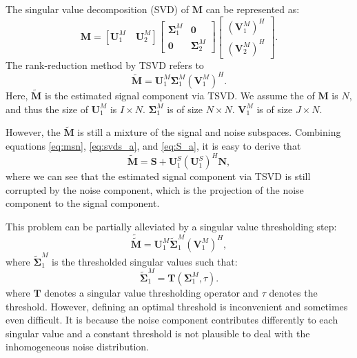 The singular value decomposition (SVD) of $\mathbf{M}$ can be represented as:
\begin{equation}
\label{eq:svdm_a}
\mathbf{M} = [\mathbf{U}_1^{M}\quad \mathbf{U}_2^{M}]\left[\begin{array}{cc}
\boldsymbol{\Sigma}_1^{M} & \mathbf{0}\\
\mathbf{0} & \boldsymbol{\Sigma}_2^{M}
\end{array}
\right]\left[\begin{array}{c}
(\mathbf{V}_1^{M})^H\\
(\mathbf{V}_2^{M})^H
\end{array}
\right].
\end{equation}
The rank-reduction method by TSVD refers to 
\begin{equation}
\label{eq:M_a}
\tilde{\mathbf{M}}=\mathbf{U}_1^M\boldsymbol{\Sigma}_1^M(\mathbf{V}_1^M)^H.
\end{equation}
Here, $\tilde{\mathbf{M}}$ is the estimated signal component via TSVD. We assume the  of $\mathbf{M}$ is $N$, and thus the size of $\mathbf{U}_1^M$ is $I\times N$. $\boldsymbol{\Sigma}_1^M$ is of size $N\times N$. $\mathbf{V}_1^M$ is of size $J\times N$.


However, the $\tilde{\mathbf{M}}$ is still a mixture of the signal and noise subspaces. Combining equations \ref{eq:msn}, \ref{eq:svds_a}, and \ref{eq:S_a}, it is easy to derive that \cite[]{yangkang2016irr5d}
\begin{equation}
\label{eq:msn2}
\tilde{\mathbf{M}}=\mathbf{S}+\mathbf{U}_1^S(\mathbf{U}_1^S)^H\mathbf{N},
\end{equation}
where we can see that the estimated signal component via TSVD is still corrupted by the noise component, which is the projection of the noise component to the signal component.

This problem can be partially alleviated by a singular value thresholding step:
\begin{equation}
\label{eq:M_a}
\tilde{\tilde{\mathbf{M}}}=\mathbf{U}_1^M\tilde{\boldsymbol{\Sigma}}_1^M(\mathbf{V}_1^M)^H,
\end{equation}
where $\tilde{\boldsymbol{\Sigma}}_1^M$ is the thresholded singular values such that:
\begin{equation}
\label{eq:thr}
\tilde{\boldsymbol{\Sigma}}_1^M = \mathbf{T}(\boldsymbol{\Sigma}_1^M,\tau).
\end{equation}
where $\mathbf{T}$ denotes a singular value thresholding operator and $\tau$ denotes the threshold. However, defining an optimal threshold is inconvenient and sometimes even difficult. It is because the noise component contributes differently to each singular value and a constant threshold is not plausible to deal with the inhomogeneous noise distribution. 

